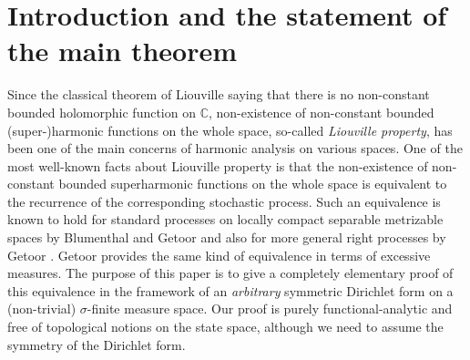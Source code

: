 %
\section{Introduction and the statement of the main theorem}\label{sec:intro}
%
Since the classical theorem of Liouville saying that there is no non-constant
bounded holomorphic function on $\mathbb{C}$, non-existence of non-constant bounded
(super-)harmonic functions on the whole space, so-called \emph{Liouville property},
has been one of the main concerns of harmonic analysis on various spaces.
One of the most well-known facts about Liouville property is that the non-existence
of non-constant bounded superharmonic functions on the whole space is equivalent to
the recurrence of the corresponding stochastic process. Such an equivalence is
known to hold for standard processes on locally compact separable metrizable spaces
by Blumenthal and Getoor \cite[Chapter II, (4.22)]{BG} and also for more general
right processes by Getoor \cite[Proposition (2.4)]{Get:LMN80}.
Getoor \cite[Proposition 2.14]{Get:Exc} provides the same kind of equivalence
in terms of excessive measures.
The purpose of this paper is to give a completely elementary proof of this
equivalence in the framework of an \emph{arbitrary} symmetric Dirichlet form
on a (non-trivial) $\sigma$-finite measure space. Our proof is purely
functional-analytic and free of topological notions on the state space,
although we need to assume the symmetry of the Dirichlet form.

